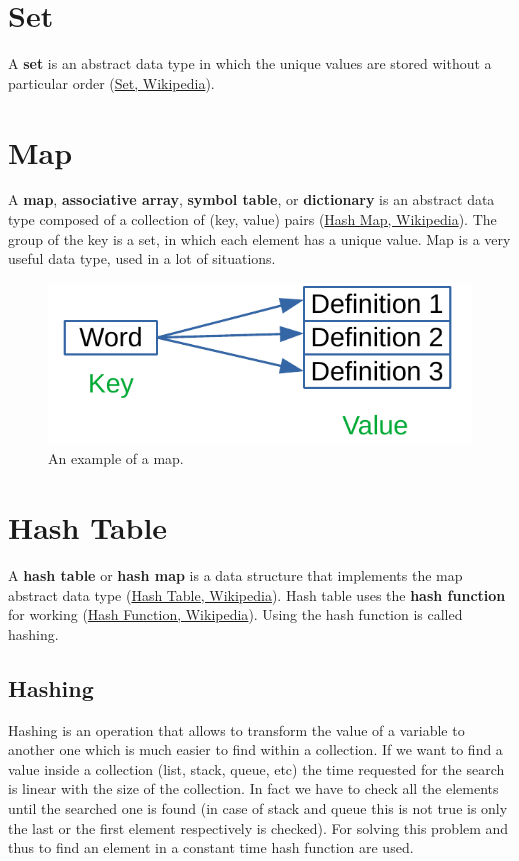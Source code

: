 \section{Set}
A \textbf{set} is an abstract data type in which the unique values are stored without a particular order \cite{wikiset} (\href{https://en.wikipedia.org/wiki/Set_(abstract_data_type)}{Set, Wikipedia}).

\section{Map}
A \textbf{map}, \textbf{associative array}, \textbf{symbol table}, or \textbf{dictionary} is an abstract data type composed of a collection of (key, value) pairs \cite{wikihashmap} (\href{https://en.wikipedia.org/wiki/Associative_array}{Hash Map, Wikipedia}). The group of the key is a set, in which each element has a unique value. Map is a very useful data type, used in a lot of situations. 

\begin{figure}[H]
	\begin{center}
		\includegraphics[scale=.6]{chapters/datastructures/images/map_1.pdf}
		\caption[An example of a map.]{An example of a map.}
		\label{map_1}
	\end{center}
\end{figure}

\section{Hash Table}
A \textbf{hash table} or \textbf{hash map} is a data structure that implements the map abstract data type \cite{wikihashtable} (\href{https://en.wikipedia.org/wiki/Hash_table}{Hash Table, Wikipedia}). Hash table uses the \textbf{hash function} for working \cite{wikihashfunction} (\href{https://en.wikipedia.org/wiki/Hash_function}{Hash Function, Wikipedia}). Using the hash function is called hashing.

\subsection{Hashing}
Hashing is an operation that allows to transform the value of a variable to another one which is much easier to find within a collection. If we want to find a value inside a collection (list, stack, queue, etc) the time requested for the search is linear with the size of the collection. In fact we have to check all the elements until the searched one is found (in case of stack and queue this is not true is only the last or the first element respectively is checked). For solving this problem and thus to find an element in a constant time hash function are used. 

